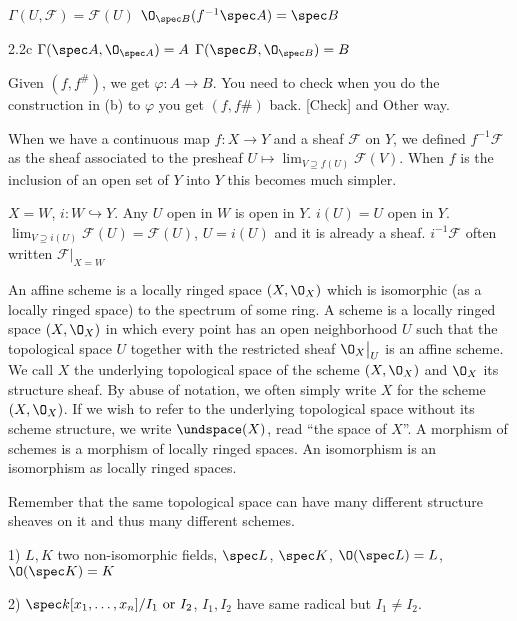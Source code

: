 \begin{enumerate}[(a)]
$\Gamma(U,\mathcal{F})= \mathcal{F}(U)$
$\O_{\spec B}(f^{-1} \spec A)= \spec B$

2.2c $\Gamma(\spec A, \O_{\spec A})= A$
$\Gamma(\spec B, \O_{\spec B})= B$

Given $(f,f^\#)$, we get $\varphi: A \to B$. You need to check when you do the construction in (b) to $\varphi$ you get $(f,f\#)$ back. [Check] and Other way. 
\end{enumerate}



When we have a continuous map $f: X \to Y$ and a sheaf $\mathcal{F}$ on $Y$, we defined $f^{-1} \mathcal{F}$ as the sheaf associated to the presheaf $U \mapsto \lim_{V \supseteq f(U)} \mathcal{F}(V)$. When $f$ is the inclusion of an open set of $Y$ into $Y$ this becomes much simpler.

$X= W$, $i: W \hookrightarrow Y$. Any $U$ open in $W$ is open in $Y$. $i(U)= U$ open in $Y$. $\lim_{V \supseteq i(U)} \mathcal{F}(U) = \mathcal{F}(U)$, $U= i(U)$ and it is already a sheaf. $i^{-1} \mathcal{F}$ often written $\mathcal{F} \big|_{X= W}$


\begin{dfn}
An affine scheme is a locally ringed space $(X, \O_X)$ which is isomorphic (as a locally ringed space) to the spectrum of some ring. A scheme is a locally ringed space $(X,\O_X)$ in which every point has an open neighborhood $U$ such that the topological space $U$ together with the restricted sheaf $\O_X\big|_U$ is an affine scheme. We call $X$ the underlying topological space of the scheme $(X, \O_X)$ and $\O_X$ its structure sheaf. By abuse of notation, we often simply write $X$ for the scheme $(X,\O_X)$. If we wish to refer to the underlying topological space without its scheme structure, we write $\undspace(X)$, read ``the space of $X$''. A morphism of schemes is a morphism of locally ringed spaces. An isomorphism is an isomorphism as locally ringed spaces. 
\end{dfn}






\begin{rem}
Remember that the same topological space can have many different structure sheaves on it and thus many different schemes.
\end{rem}


\begin{ex}
1) $L,K$ two non-isomorphic fields, $\spec L$, $\spec K$, $\O(\spec L)= L$, $\O(\spec K)= K$

2) $\spec k[x_1,\ldots,x_n]/I_1 \text{ or }I_2$, $I_1,I_2$ have same radical but $I_1 \neq I_2$.
\end{ex}


